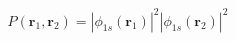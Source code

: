 \documentclass[preview]{standalone}
\begin{document}
\begin{align*}
P(\mathbf{r}_1, \mathbf{r}_2) = |\phi_{1s}(\mathbf{r}_1)|^2 |\phi_{1s}(\mathbf{r}_2)|^2
\end{align*}
\end{document}
